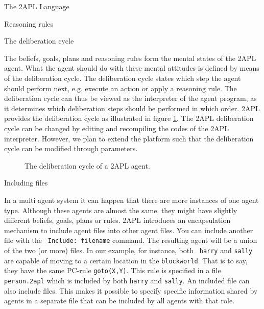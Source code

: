 \begin{chapter}{The 2APL Language}
\begin{section}{Reasoning rules}
\begin{subsection}
\end{subsection}
\end{section}


\begin{section}{The deliberation cycle}

The beliefs, goals, plans and reasoning rules form the mental states
of the 2APL agent. What the agent should do with these mental
attitudes is defined by means of the deliberation cycle. The
deliberation cycle states which step the agent should perform next,
e.g. execute an action or apply a reasoning rule. The deliberation
cycle can thus be viewed as the interpreter of the agent program, as
it determines which deliberation steps should be performed in which
order. 2APL provides the deliberation cycle as illustrated in figure
\ref{fig:delib}. The 2APL deliberation cycle can be changed by
editing and recompiling the codes of the 2APL interpreter. However,
we plan to extend the platform such that the deliberation cycle can
be modified through parameters.

\begin{figure}[ht]
    \caption{The deliberation cycle of a 2APL agent.}\label{fig:delib}
\end{figure}

\end{section}


\begin{section}{Including files}\label{sec:include}

In a multi agent system it can happen that there are more instances
of one agent type. Although these agents are almost the same, they
might have slightly different beliefs, goals, plans or rules. 2APL
introduces an encapsulation mechanism to include agent files into
other agent files. You can include another file with the {\tt
Include: filename} command. The resulting agent will be a union of
the two (or more) files. In our example, for instance, both {\tt
harry} and {\tt sally} are capable of moving to a certain location
in the {\tt blockworld}. That is to say, they have the same PC-rule
{\tt goto(X,Y)}. This rule is specified in a file {\tt person.2apl}
which is included by both {\tt harry} and {\tt sally}. An included
file can also include files. This makes it possible to specify
specific information shared by agents in a separate file that can be
included by all agents with that role.
\end{section}
\end{chapter}

